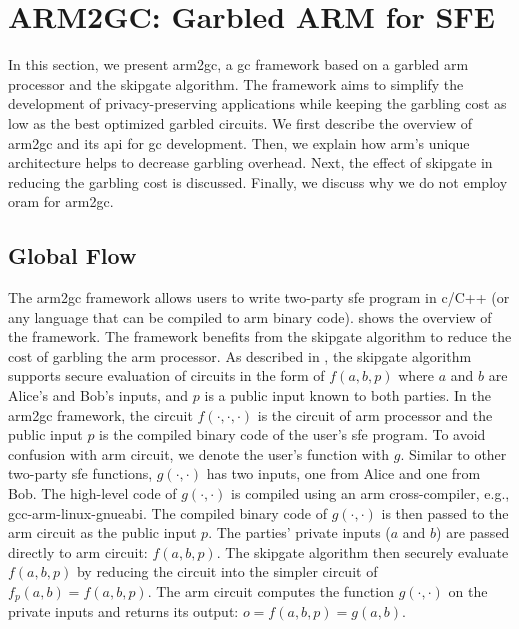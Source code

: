 \section{ARM2GC: Garbled ARM for SFE}\label{sec:processor-arm}
In this section, we present \gls{arm2gc}, a \acrshort{gc} framework based on a garbled \gls{arm} processor and the \gls{skipgate} algorithm.
The framework aims to simplify the development of privacy-preserving applications while keeping the garbling cost as low as the best optimized garbled circuits.
We first describe the overview of \gls{arm2gc} and its \acrshort{api} for \acrshort{gc} development.
Then, we explain how \gls{arm}'s unique architecture helps to decrease garbling overhead.
Next, the effect of \gls{skipgate} in reducing the garbling cost is discussed.
Finally, we discuss why we do not employ \acrshort{oram} for \gls{arm2gc}.

\subsection{Global Flow}\label{ssec:arm-global}
The \gls{arm2gc} framework allows users to write two-party \acrshort{sfe} program in \gls{c}/C++ (or any language that can be compiled to \gls{arm} binary code).
 shows the overview of the framework.
The framework benefits from the \gls{skipgate} algorithm to reduce the cost of garbling the \gls{arm} processor.
As described in , the \gls{skipgate} algorithm supports secure evaluation of circuits in the form of $f(a,b,p)$ where $a$ and $b$ are Alice's and Bob's inputs, and $p$ is a public input known to both parties.
In the \gls{arm2gc} framework, the circuit $f(\cdot,\cdot,\cdot)$ is the circuit of \gls{arm} processor and the public input $p$ is the compiled binary code of the user's \acrshort{sfe} program.
To avoid confusion with \gls{arm} circuit, we denote the user's function with $g$.
Similar to other two-party \acrshort{sfe} functions, $g(\cdot,\cdot)$ has two inputs, one from Alice and one from Bob.
The high-level code of $g(\cdot,\cdot)$ is compiled using an \gls{arm} cross-compiler, e.g., gcc-arm-linux-gnueabi.
The compiled binary code of $g(\cdot,\cdot)$ is then passed to the \gls{arm} circuit as the public input $p$.
The parties' private inputs ($a$ and $b$) are passed directly to \gls{arm} circuit: $f(a,b,p)$.
The \gls{skipgate} algorithm then securely evaluate $f(a,b,p)$ by reducing the circuit into the simpler circuit of $f_{p}(a,b) = f(a,b,p)$.
The \gls{arm} circuit computes the function $g(\cdot,\cdot)$ on the private inputs and returns its output: $o = f(a,b,p) = g(a,b)$.


